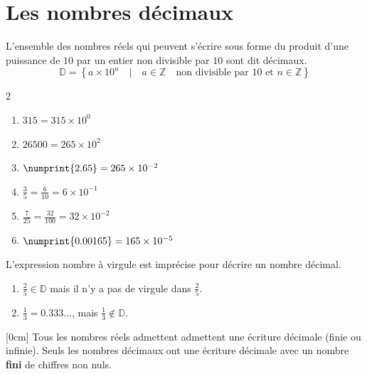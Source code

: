%	 
\newpage 
{}  
\pagestyle{scrheadings} %
\onehalfspacing
\section{Les nombres décimaux}
\begin{definition} 
	L'ensemble des nombres réels qui peuvent s'écrire sous forme du produit d'une puissance de $10$ par un entier non divisible par $10$ sont dit décimaux.
	\[
	\mathbb{D}=\left\{a\times 10^n \quad \big| \quad  a\in\mathbb{Z}\quad \text{non divisible par 10 et } n\in\mathbb{Z}\right\}
	\]  
\end{definition}
\begin{example}\label{chap01:example:decimaux} \hfill 
	\begin{multicols}{2} 
		\begin{enumerate}[label={\alph*)\rule{0pt}{1.8em}},leftmargin=*]
			\item $315=315\times 10^0$
			\item $26500 = 265 \times 10^2$
			\item $\numprint{2.65}=265\times 10^{-2}$
			\item $\frac{3}{5}=\frac{6}{10}=6\times 10^{-1}$
			\item $\frac{7}{25}=\frac{32}{100}=32\times 10^{-2}$
			\item $\numprint{0.00165}=165\times 10^{-5}$
		\end{enumerate} 
	\end{multicols}
\end{example}
\begin{remark} L'expression \og nombre à virgule \fg{} est imprécise pour décrire un nombre décimal. 
	\begin{enumerate}[label={\textbullet\rule{0pt}{1.8em}},leftmargin=*]
		\item $\frac{2}{5}\in \mathbb{D}$ mais il n'y a pas de virgule dans $\frac{2}{5}$.
		\item $\frac{1}{3}=0.333\ldots$, mais $\frac{1}{3}\notin \mathbb{D}$.  
	\end{enumerate} 
\end{remark}
[0cm]
Tous les nombres réels admettent admettent une écriture décimale (finie ou infinie). Seuls les nombres décimaux ont une écriture décimale avec un nombre \textbf{fini} de chiffres non nuls.

